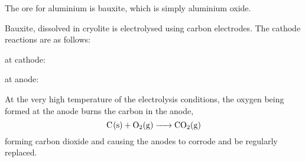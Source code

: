The ore for aluminium is bauxite, which is simply aluminium oxide.

Bauxite, dissolved in cryolite is electrolysed using carbon electrodes. The cathode reactions
are as follows:
\begin{center}
	at cathode: 

	at anode: 
\end{center}

At the very high temperature of the electrolysis conditions, the oxygen being formed at the anode
burns the carbon in the anode,
$$\ce{C(s) + O2(g) -> CO2(g)}$$
forming carbon dioxide and causing the anodes to corrode and be regularly replaced.
